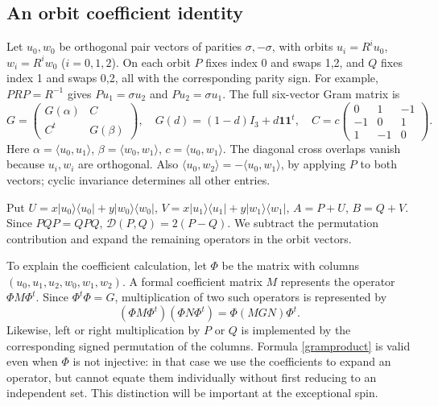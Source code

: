 \documentclass[11pt]{article}
\newcommand{\DD}{\mathcal D}
\newcommand{\pr}[1]{|#1\rangle\langle#1|}
\begin{document}
\subsection{An orbit coefficient identity}
Let $u_0,w_0$ be orthogonal pair vectors of parities $\sigma,-\sigma$, with orbits $u_i=R^iu_0$, $w_i=R^iw_0$ ($i=0,1,2$). On each orbit $P$ fixes index 0 and swaps 1,2, and $Q$ fixes index 1 and swaps 0,2, all with the corresponding parity sign. For example, $PRP=R^{-1}$ gives $Pu_1=\sigma u_2$ and $Pu_2=\sigma u_1$. The full six-vector Gram matrix is
\begin{equation}\label{gram}
 G=\begin{pmatrix}G(\alpha)&C\\C^t&G(\beta)\end{pmatrix},\quad
 G(d)=(1-d)I_3+d\mathbf1\mathbf1^t,\quad
 C=c\begin{pmatrix}0&1&-1\\-1&0&1\\1&-1&0\end{pmatrix}.
\end{equation}
Here $\alpha=\langle u_0,u_1\rangle$, $\beta=\langle w_0,w_1\rangle$, $c=\langle u_0,w_1\rangle$. The diagonal cross overlaps vanish because $u_i,w_i$ are orthogonal. Also $\langle u_0,w_2\rangle=-\langle u_0,w_1\rangle$, by applying $P$ to both vectors; cyclic invariance determines all other entries. 

Put $U=x\pr{u_0}+y\pr{w_0}$, $V=x\pr{u_1}+y\pr{w_1}$, $A=P+U$, $B=Q+V$. Since $PQP=QPQ$, $\DD(P,Q)=2(P-Q)$. We subtract the permutation contribution and expand the remaining operators in the orbit vectors.

To explain the coefficient calculation, let $\Phi$ be the matrix with columns $(u_0,u_1,u_2,w_0,w_1,w_2)$. A formal coefficient matrix $M$ represents the operator $\Phi M\Phi^t$. Since $\Phi^t\Phi=G$, multiplication of two such operators is represented by
\begin{equation}\label{gramproduct}
 (\Phi M\Phi^t)(\Phi N\Phi^t)=\Phi(MGN)\Phi^t.
\end{equation}
Likewise, left or right multiplication by $P$ or $Q$ is implemented by the corresponding signed permutation of the columns. Formula \eqref{gramproduct} is valid even when $\Phi$ is not injective: in that case we use the coefficients to expand an operator, but cannot equate them individually without first reducing to an independent set. This distinction will be important at the exceptional spin.
\end{document}
